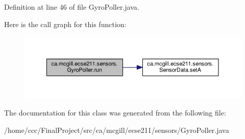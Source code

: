 Definition at line 46 of file Gyro\+Poller.\+java.

Here is the call graph for this function\+:
\nopagebreak
\begin{figure}[H]
\begin{center}
\leavevmode
\includegraphics[width=350pt]{classca_1_1mcgill_1_1ecse211_1_1sensors_1_1_gyro_poller_a2a52059192555ece72190fa44a761d28_cgraph}
\end{center}
\end{figure}


The documentation for this class was generated from the following file\+:\begin{DoxyCompactItemize}
\item 
/home/ccc/\+Final\+Project/src/ca/mcgill/ecse211/sensors/Gyro\+Poller.\+java\end{DoxyCompactItemize}
